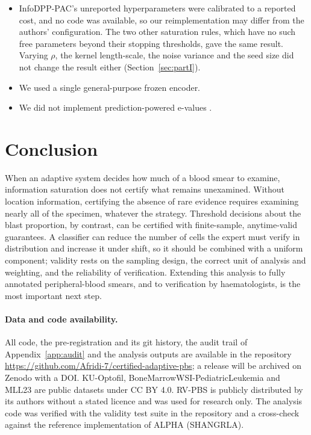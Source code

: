 \documentclass[11pt]{article}
\theoremstyle{remark}
\theoremstyle{definition}
\begin{document}
\begin{itemize}
\item InfoDPP-PAC's unreported hyperparameters were calibrated to a reported cost, and no code was available, so our reimplementation may differ from the authors' configuration. The two other saturation rules, which have no such free parameters beyond their stopping thresholds, gave the same result. Varying $\rho$, the kernel length-scale, the noise variance and the seed size did not change the result either (Section~\ref{sec:partI}).
\item We used a single general-purpose frozen encoder.
\item We did not implement prediction-powered e-values \cite{csillag2025ppe}.
\end{itemize}

\section{Conclusion}
When an adaptive system decides how much of a blood smear to examine, information saturation does not certify what remains unexamined. Without location information, certifying the absence of rare evidence requires examining nearly all of the specimen, whatever the strategy. Threshold decisions about the blast proportion, by contrast, can be certified with finite-sample, anytime-valid guarantees. A classifier can reduce the number of cells the expert must verify in distribution and increase it under shift, so it should be combined with a uniform component; validity rests on the sampling design, the correct unit of analysis and weighting, and the reliability of verification. Extending this analysis to fully annotated peripheral-blood smears, and to verification by haematologists, is the most important next step.

\paragraph{Data and code availability.} All code, the pre-registration and its git history, the audit trail of Appendix~\ref{app:audit} and the analysis outputs are available in the repository \url{https://github.com/Afridi-7/certified-adaptive-pbs}; a release will be archived on Zenodo with a DOI. KU-Optofil, BoneMarrowWSI-PediatricLeukemia and MLL23 are public datasets under CC BY 4.0. RV-PBS is publicly distributed by its authors without a stated licence and was used for research only. The analysis code was verified with the validity test suite in the repository and a cross-check against the reference implementation of ALPHA (SHANGRLA).
\end{document}
